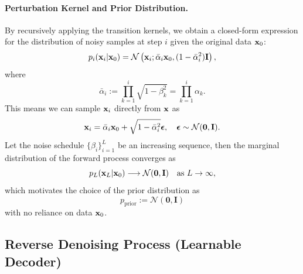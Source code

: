 \paragraph{Perturbation Kernel and Prior Distribution.}
By recursively applying the transition kernels, we obtain a closed-form expression for the distribution of noisy samples at step $i$ given the original data ${\mathbf{x}}_0$:
\[
p_i({\mathbf{x}}_i|{\mathbf{x}}_0) = \mathcal{N}\left({\mathbf{x}}_i; \bar{\alpha}_i {\mathbf{x}}_0, (1 - \bar{\alpha}_i^2) {\mathbf{I}} \right),
\]
where 
\[
\bar{\alpha}_i := \prod_{k=1}^i \sqrt{1-\beta_k^2} = \prod_{k=1}^i \alpha_k.
\]
This means we can sample ${\mathbf{x}}_i$ directly from ${\mathbf{x}}$ as
\begin{align}\label{eq:ddpm-forward}
    {\mathbf{x}}_i = \bar{\alpha}_i {\mathbf{x}}_0 + \sqrt{1-\bar{\alpha}_i^2}   \bm{\epsilon}, \quad \bm{\epsilon} \sim \mathcal{N}(\bm{0}, {\mathbf{I}}).
\end{align}
Let the noise schedule $ \{\beta_i\}_{i=1}^L $ be an increasing sequence, then the marginal distribution of the forward process converges as
\[
p_L(\mathbf{x}_L | {\mathbf{x}}_0) \longrightarrow \mathcal{N}(\mathbf{0}, \mathbf{I}) \quad \text{as } L \to \infty,
\]
which motivates the choice of the prior distribution as
\[
p_{\text{prior}} := \mathcal{N}(\mathbf{0}, \mathbf{I})
\]
with no reliance on data ${\mathbf{x}}_0$.


\subsection{Reverse Denoising Process (Learnable Decoder)}


